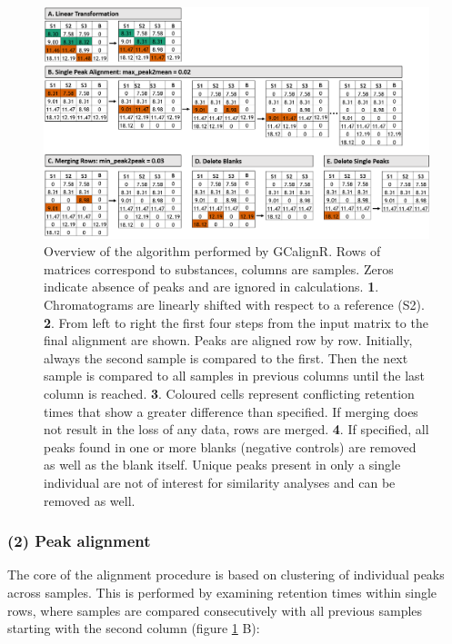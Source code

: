 \begin{figure}[htbp]
\centering
\includegraphics[width=13cm]{figures/algorithm}
\caption{Overview of the algorithm performed by GCalignR. Rows of matrices correspond to substances, columns are samples. Zeros indicate absence of peaks and are ignored in calculations. \textbf{1}. Chromatograms are linearly shifted with respect to a reference (S2). \textbf{2}. From left to right the first four steps from the input matrix to the final alignment are shown. Peaks are aligned row by row. Initially, always the second sample is compared to the first. Then the next sample is compared to all samples in previous columns until the last column is reached. \textbf{3}. Coloured cells represent conflicting retention times that show a greater difference than specified. If merging does not result in the loss of any data, rows are merged. \textbf{4}. If specified, all peaks found in one or more blanks (negative controls) are removed as well as the blank itself. Unique peaks present in only a single individual are not of interest for similarity analyses and can be removed as well.}
\label{figure:algorithm}
\end{figure}

\subsubsection{(2) Peak alignment}\label{peak-alignment}

The core of the alignment procedure is based on clustering of individual
peaks across samples. This is performed by examining retention times
within single rows, where samples are compared consecutively with all
previous samples starting with the second column (figure
\ref{figure:algorithm} B):\par

